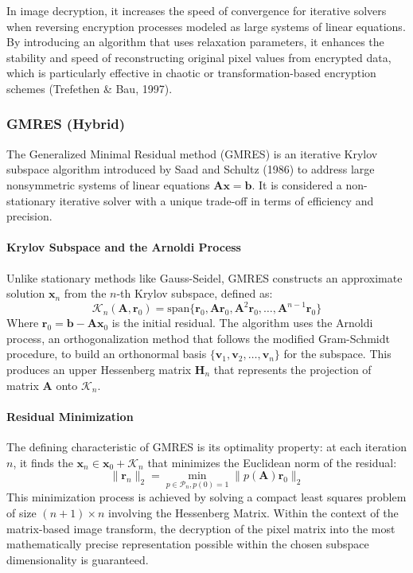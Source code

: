 \documentclass[11pt]{article}
\begin{document}
In image decryption, it increases the speed of convergence for iterative solvers when reversing encryption processes modeled as large systems of linear equations. By introducing an algorithm that uses relaxation parameters, it enhances the stability and speed of reconstructing original pixel values from encrypted data, which is particularly effective in chaotic or transformation-based encryption schemes (Trefethen \& Bau, 1997).

\subsubsection{GMRES (Hybrid)}
The Generalized Minimal Residual method (GMRES) is an iterative Krylov subspace algorithm introduced by Saad and Schultz (1986) to address large nonsymmetric systems of linear equations $\mathbf{A}\mathbf{x} = \mathbf{b}$. It is considered a non-stationary iterative solver with a unique trade-off in terms of efficiency and precision.

\paragraph{Krylov Subspace and the Arnoldi Process}
Unlike stationary methods like Gauss-Seidel, GMRES constructs an approximate solution $\mathbf{x}_n$ from the $n$-th Krylov subspace, defined as:
$$ \mathcal{K}_{n}(\mathbf{A},\mathbf{r}_0) = \text{span}\{\mathbf{r}_0, \mathbf{A}\mathbf{r}_0, \mathbf{A}^{2}\mathbf{r}_0, \dots, \mathbf{A}^{n-1}\mathbf{r}_0\} $$
Where $\mathbf{r}_0 = \mathbf{b} - \mathbf{A}\mathbf{x}_0$ is the initial residual. The algorithm uses the Arnoldi process, an orthogonalization method that follows the modified Gram-Schmidt procedure, to build an orthonormal basis $\{\mathbf{v}_1, \mathbf{v}_2, \dots, \mathbf{v}_n\}$ for the subspace. This produces an upper Hessenberg matrix $\mathbf{H}_n$ that represents the projection of matrix $\mathbf{A}$ onto $\mathcal{K}_n$.

\paragraph{Residual Minimization}
The defining characteristic of GMRES is its optimality property: at each iteration $n$, it finds the $\mathbf{x}_n \in \mathbf{x}_0 + \mathcal{K}_n$ that minimizes the Euclidean norm of the residual:
$$ \|\mathbf{r}_n\|_2 = \min_{p \in \mathcal{P}_n, p(0)=1} \|p(\mathbf{A})\mathbf{r}_0\|_2 $$
This minimization process is achieved by solving a compact least squares problem of size $(n+1) \times n$ involving the Hessenberg Matrix. Within the context of the matrix-based image transform, the decryption of the pixel matrix into the most mathematically precise representation possible within the chosen subspace dimensionality is guaranteed.
\end{document}
